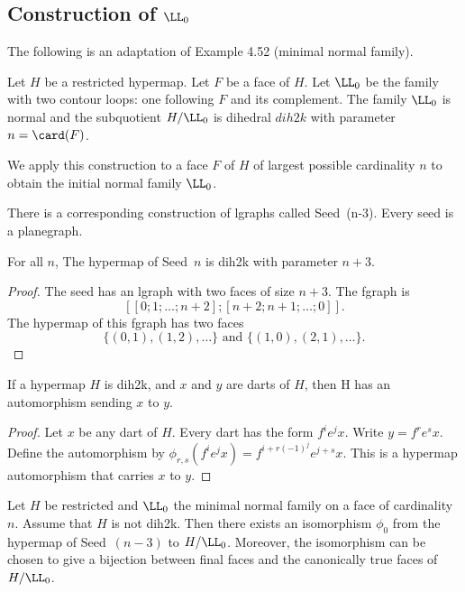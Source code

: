 \begin{lemma}
\begin{lemma}
\subsection{Construction of $\LL_0$}


The following is an adaptation of Example 4.52 (minimal normal family).

\begin{lemma} Let $H$ be a restricted hypermap.
  Let $F$ be a face of $H$.  Let $\LL_0$ be the family with two
  contour loops: one following $F$ and its complement.  The family
  $\LL_0$ is normal and the subquotient $H/\LL_0$ is dihedral 
  $dih2k$ with parameter $n=\card(F)$.
\end{lemma} 

We apply this construction to a face $F$ of $H$ of largest possible
cardinality $n$ to obtain the initial normal family $\LL_0$.

There is a corresponding construction of lgraphs called
Seed~(n-3).  Every seed is a planegraph.

\begin{lemma} For all $n$,
The hypermap of Seed~$n$ is dih2k with parameter $n+3$.
\end{lemma} 

\begin{proof}
The seed has an lgraph with two faces of size $n+3$.
The fgraph is 
\[
[[0;1;\ldots;n+2];[n+2;n+1;\ldots;0]].
\]
The hypermap of this fgraph has two faces
\[
\{(0,1),(1,2),\ldots\} \text{ and } \{(1,0),(2,1),\ldots\}.
\]
\end{proof}

\begin{lemma} If a hypermap $H$ is dih2k, 
and $x$ and $y$ are darts of $H$, then H has an
  automorphism sending $x$ to $y$.
\end{lemma} 

\begin{proof} Let $x$ be any dart of $H$.  Every dart has the form
  $f^i e^j x$.  Write $y = f^r e^s x$.  Define the automorphism by 
$\phi_{r,s}(f^i e^j x) = f^{i+r (-1)^j}  e^{j+s} x$.  
This is a hypermap automorphism that carries $x$ to $y$.
\end{proof}

\begin{lemma}
Let $H$ be restricted and $\LL_0$ the minimal normal family
on a face of cardinality $n$.  Assume that $H$ is not dih2k.
Then there exists an isomorphism
$\phi_0$ from the hypermap of Seed~$(n-3)$ to $H/\LL_0$.
Moreover, the isomorphism can be chosen to give a bijection 
between final faces and the canonically true faces of $H/\LL_0$.
\end{lemma} 


\end{lemma}
\end{lemma}
